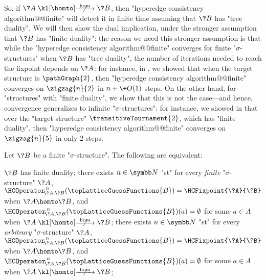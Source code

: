 So, if $\?A \nothomto \?B$, then "hyperedge consistency algorithm@@finite" will detect it in finite time assuming 
that $\?B$ has "tree duality".
We will then show the dual implication, under the stronger assumption that $\?B$ has "finite 
duality": the reason we need this stronger assumption is that while the "hyperedge consistency algorithm@@finite" converges for finite "$\sigma$-structures" when $\?B$ has "tree duality",
the number of iterations needed to reach the fixpoint depends on $\?A$:
for instance, in , we showed that when the target structure
is $\pathGraph{2}$, then "hyperedge consistency algorithm@@finite" converges
on $\zigzag{n}{2}$ in $n + \+O(1)$ steps.
On the other hand, for "structures"
with "finite duality", we show that this is not the case---and hence, convergence generalizes to 
infinite "$\sigma$-structures": for instance, we showed in 
that over the "target structure" $\transitiveTournament{2}$, which has "finite duality", 
then "hyperedge consistency algorithm@@finite" converges
on $\zigzag{n}{5}$ in only $2$ steps.

\begin{lemma}
	\AP\label{lem:hyperedge-consistency-uniform-convergence}
	Let $\?B$ be a finite "$\sigma$-structure".
	The following are equivalent:
	\begin{enumerate}
		\itemAP\label{item:hc-uniform-finite-duality}%
			$\?B$ has finite duality;
		\itemAP\label{item:hc-uniform-finite-structures}%
			there exists $n\in\N$ "st" for every \emph{finite} "$\sigma$-structure" $\?A$, $\HCOperator^{\,n}_{\!\?A,\?B}(\topLatticeGuessFunctions{B}) = \HCFixpoint{\?A}{\?B}$
			when $\?A \homto \?B$, and
			$\HCOperator^{\,n}_{\!\?A,\?B}(\topLatticeGuessFunctions{B})(a) = \emptyset$ for some $a\in A$ when $\?A \nothomto \?B$;
		\itemAP\label{item:hc-uniform-arbitrary-structures}%
			there exists $n\in\N$ "st" for every \emph{arbitrary} "$\sigma$-structure" $\?A$, $\HCOperator^{\,n}_{\!\?A,\?B}(\topLatticeGuessFunctions{B}) = \HCFixpoint{\?A}{\?B}$
			when $\?A \homto \?B$, and
			$\HCOperator^{\,n}_{\!\?A,\?B}(\topLatticeGuessFunctions{B})(a) = \emptyset$ for some $a\in A$ when $\?A \nothomto \?B$;
	\end{enumerate}
\end{lemma}

